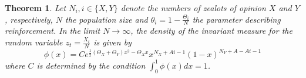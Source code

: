 \documentclass[12pt,a4paper,twoside]{article}
\newtheorem{thm}{Theorem}[section]
\begin{document}
\begin{thm}\label{theorem:weak_eff_lim}
	Let $N_i, i \in \lbrace X,Y\rbrace$ denote the numbers of zealots of opinion $X$ and $Y$, respectively, $N$ the population size and $\theta_i = 1-\frac{\Theta_i}{N}$ the parameter describing reinforcement. In the limit $N \rightarrow \infty$, the density of the invariant measure for the random variable $z_t = \frac{X_t}{N}$ is given by
	\begin{equation}
	\phi(x) = Ce^{\frac{1}{2}\left(\Theta_X + \Theta_Y\right)x^2 - \Theta_X x}x^{N_X + Ai - 1}\left(1-x\right)^{N_Y+A - Ai - 1}
	\end{equation}
	where $C$ is determined by the condition $\int_{0}^{1}\phi(x) dx = 1$.
\end{thm}
\end{document}
